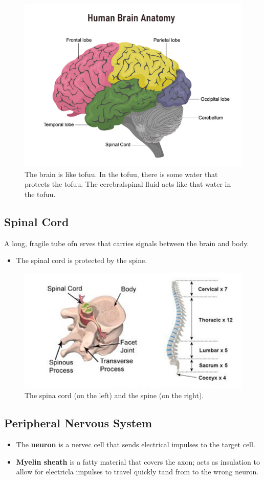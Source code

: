 \documentclass[12pt]{report}
\begin{document}
\begin{figure}[H]
\centering
    \includegraphics[width=0.5 \textwidth]{../figures/brain.jpg}
    \caption{The brain is like tofuu. In the tofuu, there is some water that protects the tofuu. The cerebralspinal fluid acts like that water in the tofuu.}
    \label{fig:brain}
\end{figure}

\subsection{Spinal Cord}
\begin{definition}
    A long, fragile tube ofn erves that carries signals between the brain and body. 
    \begin{itemize}
        \item{The spinal cord is protected by the spine.}
    \end{itemize}
\end{definition}

\begin{figure}[H]
\centering
    \includegraphics[width=0.5 \textwidth]{../figures/spinal cord.jpg}
    \caption{The spina cord (on the left) and the spine (on the right).}
    \label{fig:spinal-cord}
\end{figure}

\subsection{Peripheral Nervous System}
\begin{definition}
    \invis
    \begin{itemize}
        \item{The \textbf{neuron} is a nervec cell that sends electrical impulses to the target cell.}
        \item{\textbf{Myelin sheath} is a fatty material that covers the axon; acts as insulation to allow for electricla impulses to travel quickly tand from to the wrong neuron.}
    \end{itemize}
\end{definition}
\end{document}
